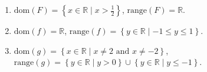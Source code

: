 \begin{enumerate}
\begin{enumerate}
\item $\text{dom} ( F ) = \left\{ {x \in \mathbb{R} \mid x > \frac{1}{2}} \right\}$,  
$\text{range} ( F ) = \mathbb{R}$.

\item $\text{dom} ( f ) = \mathbb{R}$,
$\text{range} ( f ) = \left\{ y \in \mathbb{R} \mid -1 \leq y \leq 1 \right\}$.

\item $\text{dom} ( g ) = \left\{ {x \in \mathbb{R} \mid x \ne 2\text{  and  }x \ne  - 2} \right\}$, \\
$\text{range} ( g ) = \left\{ { {y \in \mathbb{R} } \mid y > 0} \right\} \cup 
\left\{ {y \in \mathbb{R} \mid y \leqslant  - 1} \right\}$.
\end{enumerate}

\end{enumerate}
\hbreak

\endinput
